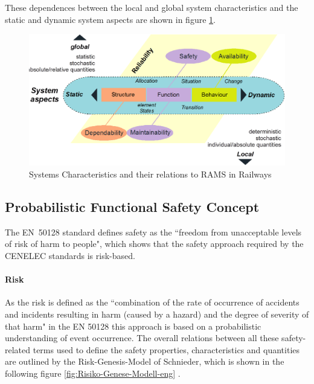 \documentclass{template/openetcs_report}
\begin{document}
These dependences between the local and global system characteristics and the static and dynamic system aspects are shown in figure \ref{fig:Reliability-RAMS}. 

\begin{figure}[htbp]
\centering
\includegraphics[width=0.7\linewidth]{images/bld_Reliability-system-characteristics}
\caption{Systems Characteristics and their relations to RAMS in Railways \cite{Schnieder.2013}}
\label{fig:Reliability-RAMS}
\end{figure}


\subsection{Probabilistic Functional Safety Concept}

The EN~50128 standard defines safety as the ``freedom from unacceptable levels of risk of harm to people", which shows that the safety approach required by the CENELEC standards is risk-based.

\paragraph{Risk}

 As the risk is defined as the ``combination of the rate of occurrence of accidents and incidents resulting in harm (caused by a hazard) and the degree of severity  of that harm" in the EN 50128 this approach is based on a probabilistic understanding of event occurrence. The overall relations between all these safety-related terms used to define the safety properties, characteristics and quantities are outlined by the Risk-Genesis-Model of Schnieder, which is shown in the following figure \ref{fig:Risiko-Genese-Modell-eng} \cite{Schnieder.2010}.
\end{document}
